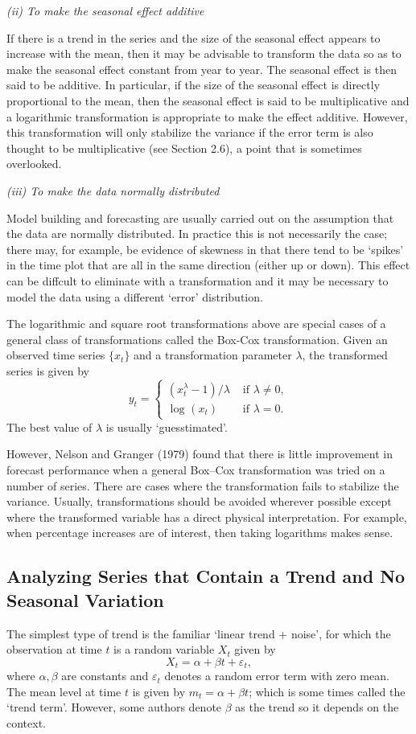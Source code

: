 \textit{(ii) To make the seasonal effect additive}

If there is a trend in the series and the size of the seasonal eﬀect appears to increase with the mean, then it may be advisable to transform the data so as to make the seasonal eﬀect constant from year to year. The seasonal effect is then said to be additive. In particular, if the size of the seasonal eﬀect is directly proportional to the mean, then the seasonal effect is said to be multiplicative and a logarithmic transformation is appropriate to make the effect additive. However, this transformation will only stabilize the variance if the error term is also thought to be multiplicative (see Section 2.6), a point that is sometimes overlooked.

\textit{(iii) To make the data normally distributed}

Model building and forecasting are usually carried out on the assumption that the data are normally distributed. In practice this is not necessarily the case; there may, for example, be evidence of skewness in that there tend to be `spikes' in the time plot that are all in the same direction (either up or down). This effect can be diffcult to eliminate with a transformation and it may be necessary to model the data using a different ‘error’ distribution.

The logarithmic and square root transformations above are special cases of a general class of transformations called the Box-Cox transformation. Given an observed time series $\{ x_t \}$ and a transformation parameter $\lambda$, the transformed series is given by 
\[ y_t = \begin{cases}
	(x_t^\lambda - 1) / \lambda &\text{ if } \lambda \neq 0, \\
	\log_{}{(x_t)} &\text{ if } \lambda = 0.
\end{cases}
\]
The best value of $\lambda$ is usually `guesstimated'. 

However, Nelson and Granger (1979) found that there is little
improvement in forecast performance when a general Box–Cox transformation
was tried on a number of series. There are cases where the transformation fails to stabilize the variance. Usually, transformations should be avoided wherever possible
except where the transformed variable has a direct physical interpretation.
For example, when percentage increases are of interest, then taking logarithms
makes sense.




\subsection{Analyzing Series that Contain a Trend and No Seasonal Variation}
The simplest type of trend is the familiar `linear trend + noise', for which the observation at time $t$ is a random variable $X_t$ given by 
\[ X_t = \alpha + \beta t + \varepsilon_t, \]
where $\alpha, \beta$ are constants and $\varepsilon_t$ denotes a random error term with zero mean. The mean level at time $t$ is given by $m_t = \alpha + \beta t$; which is some times called the `trend term'. However, some authors denote $\beta$ as the trend so it depends on the context.

